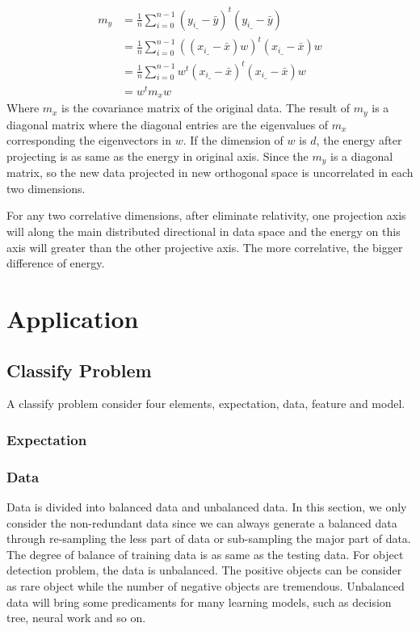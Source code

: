 \documentclass[runningheads,openany]{xhlPaper}
\begin{document}
\begin{equation}
\label{equ:pcaCovMatrixAfterProjecting}
\begin{aligned}
{m_y} &= \frac{1}{n}\sum\limits_{i = 0}^{n - 1} {{{\left( {{y_{i\_}} - \bar y} \right)}^t}\left( {{y_{i\_}} - \bar y} \right)} \\
 &= \frac{1}{n}\sum\limits_{i = 0}^{n - 1} {{{\left( {\left( {{x_{i\_}} - \bar x} \right)w} \right)}^t}\left( {{x_{i\_}} - \bar x} \right)w} \\
 &= \frac{1}{n}\sum\limits_{i = 0}^{n - 1} {{w^t}{{\left( {{x_{i\_}} - \bar x} \right)}^t}\left( {{x_{i\_}} - \bar x} \right)w} \\
 &= {w^t}{m_x}w
\end{aligned}
\end{equation}
Where $m_x$ is the covariance matrix of the original data. The result of $m_y$ is a diagonal matrix where the diagonal entries are the eigenvalues of $m_x$ 
corresponding the eigenvectors in $w$.
If the dimension of $w$ is $d$, the energy after projecting is as same as the energy in original axis.
Since the $m_y$ is a diagonal matrix, so the new data projected in new orthogonal space is uncorrelated in each two dimensions.

For any two correlative dimensions, after eliminate relativity, one projection axis will along the main distributed directional in data space and the energy on this axis will greater than the other projective axis. The more correlative, the bigger difference of energy.


\chapter{Application}
\section{Classify Problem}
A classify problem consider four elements, expectation, data, feature and model.
\subsection{Expectation}
\subsection{Data}
Data is divided into balanced data and unbalanced data. In this section, we only consider the non-redundant data since we can always generate a balanced data through re-sampling the less part of data or sub-sampling the major part of data. The degree of balance of training data is as same as the testing data. For object detection problem, the data is unbalanced. The positive objects can be consider as rare object while the number of negative objects are tremendous. Unbalanced data will bring some predicaments for many learning models, such as decision tree, neural work and so on.
\end{document}
